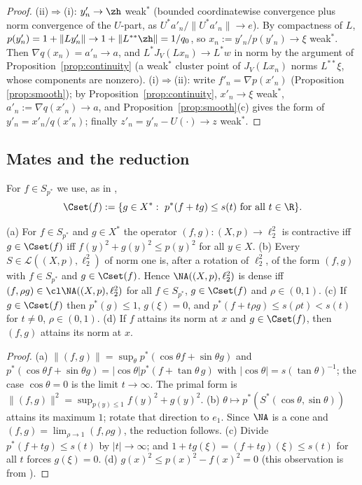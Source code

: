 \begin{proof}
(ii)$\Rightarrow$(i): $y'_n\to\zh$ weak$^*$ (bounded coordinatewise
convergence plus norm convergence of the $U$-part, as $U^*a'_n/\|U^*a'_n\|\to
e$).  By compactness of $L$, $p(y'_n)=1+\|Ly'_n\|\to1+\|L^{**}\zh\|=1/q_0$,
so $x_n:=y'_n/p(y'_n)\to\xi$ weak$^*$.  Then $\nabla q(x_n)=a'_n\to a$, and
$L^*J_V(Lx_n)\to L^*w$ in norm by the argument of
Proposition~\ref{prop:continuity} (a weak$^*$ cluster point of $J_V(Lx_n)$
norms $L^{**}\xi$, whose components are nonzero).
(i)$\Rightarrow$(ii): write $f'_n=\nabla p(x'_n)$ (Proposition
\ref{prop:smooth}); by Proposition~\ref{prop:continuity}, $x'_n\to\xi$
weak$^*$, $a'_n:=\nabla q(x'_n)\to a$, and Proposition~\ref{prop:smooth}(c)
gives the form of $y'_n=x'_n/q(x'_n)$; finally $z'_n=y'_n-U(\cdot)\to z$
weak$^*$.
\end{proof}

\subsection{Mates and the reduction}
For $f\in S_{p^*}$ we use, as in \cite{PrA},
\[
 \Cset(f):=\{g\in X^*:\ p^*(f+tg)\le s(t)\ \text{for all }t\in\R\}.
\]

\begin{proposition}[Reduction]\label{prop:reduction}
\textup{(a)} For $f\in S_{p^*}$ and $g\in X^*$ the operator
$(f,g):(X,p)\to\ell_2^2$ is contractive iff $g\in\Cset(f)$ iff
$f(y)^2+g(y)^2\le p(y)^2$ for all $y\in X$.
\textup{(b)} Every $S\in\mathcal L((X,p),\ell_2^2)$ of norm one is, after a
rotation of $\ell_2^2$, of the form $(f,g)$ with $f\in S_{p^*}$ and
$g\in\Cset(f)$.  Hence $\NA((X,p),\ell_2^2)$ is dense iff
$(f,\rho g)\in\cl\NA((X,p),\ell_2^2)$ for all $f\in S_{p^*}$,
$g\in\Cset(f)$ and $\rho\in(0,1)$.
\textup{(c)} If $g\in\Cset(f)$ then $p^*(g)\le1$, $g(\xi)=0$, and
$p^*(f+t\rho g)\le s(\rho t)<s(t)$ for $t\ne0$, $\rho\in(0,1)$.
\textup{(d)} If $f$ attains its norm at $x$ and $g\in\Cset(f)$, then
$(f,g)$ attains its norm at $x$.
\end{proposition}

\begin{proof}
(a) $\|(f,g)\|=\sup_\theta p^*(\cos\theta f+\sin\theta g)$ and
$p^*(\cos\theta f+\sin\theta g)=|\cos\theta|p^*(f+\tan\theta\,g)$ with
$|\cos\theta|=s(\tan\theta)^{-1}$; the case $\cos\theta=0$ is the limit
$t\to\infty$.  The primal form is
$\|(f,g)\|^2=\sup_{p(y)\le1}f(y)^2+g(y)^2$.
(b) $\theta\mapsto p^*(S^*(\cos\theta,\sin\theta))$ attains its maximum
$1$; rotate that direction to $e_1$.  Since $\NA$ is a cone and
$(f,g)=\lim_{\rho\to1}(f,\rho g)$, the reduction follows.
(c) Divide $p^*(f+tg)\le s(t)$ by $|t|\to\infty$; and
$1+tg(\xi)=(f+tg)(\xi)\le s(t)$ for all $t$ forces $g(\xi)=0$.
(d) $g(x)^2\le p(x)^2-f(x)^2=0$ (this observation is from \cite{KLMW}).
\end{proof}

